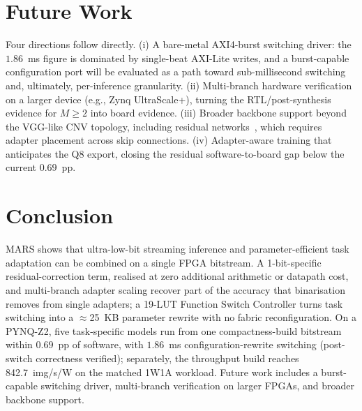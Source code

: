 \documentclass[journal]{IEEEtran}
\begin{document}
\section{Future Work}
Four directions follow directly. (i) A bare-metal AXI4-burst switching driver: the $1.86$~ms figure is dominated by single-beat AXI-Lite writes, and a burst-capable configuration port will be evaluated as a path toward sub-millisecond switching and, ultimately, per-inference granularity. (ii) Multi-branch hardware verification on a larger device (e.g., Zynq UltraScale+), turning the RTL/post-synthesis evidence for $M{\geq}2$ into board evidence. (iii) Broader backbone support beyond the VGG-like CNV topology, including residual networks~\cite{He2016ResNet}, which requires adapter placement across skip connections. (iv) Adapter-aware training that anticipates the Q8 export, closing the residual software-to-board gap below the current $0.69$~pp.

\section{Conclusion}
MARS shows that ultra-low-bit streaming inference and parameter-efficient task adaptation can be combined on a single FPGA bitstream. A 1-bit-specific residual-correction term, realised at zero additional arithmetic or datapath cost, and multi-branch adapter scaling recover part of the accuracy that binarisation removes from single adapters; a 19-LUT Function Switch Controller turns task switching into a $\approx$25~KB parameter rewrite with no fabric reconfiguration. On a PYNQ-Z2, five task-specific models run from one compactness-build bitstream within $0.69$~pp of software, with $1.86$~ms configuration-rewrite switching (post-switch correctness verified); separately, the throughput build reaches 842.7~img/s/W on the matched 1W1A workload. Future work includes a burst-capable switching driver, multi-branch verification on larger FPGAs, and broader backbone support.
\end{document}
